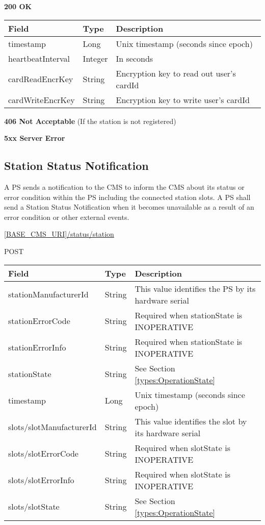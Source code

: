 \textbf{200 OK}

\begin{tabularx}{\linewidth}{ | l | l | X | }
  \hline
  \rowcolor{table-head}
  Field & Type & Description \\
  \hline
  timestamp & Long & Unix timestamp (seconds since epoch) \\
  heartbeatInterval & Integer & In seconds \\
  cardReadEncrKey & String & Encryption key to read out user's cardId \\
  cardWriteEncrKey & String & Encryption key to write user's cardId \\
    \hline
\end{tabularx}

\textbf{406 Not Acceptable} (If the station is not registered)

\textbf{5xx Server Error}

\subsection{Station Status Notification}

A \acs{PS} sends a notification to the \acs{CMS} to inform the \acs{CMS} about its status or error condition within the \acs{PS} including the connected station slots. A \acs{PS} shall send a Station Status Notification when it becomes unavailable as a result of an error condition or other external events.

 \url{[BASE_CMS_URI]/status/station}

 POST

\begin{table}[!h]
\vspace{-7mm}
\begin{tabularx}{\linewidth}{ | l  | l | X | }
  \hline
  \rowcolor{table-head}
  Field & Type & Description \\
  \hline
  stationManufacturerId & String 		& This value identifies the \acs{PS} by its hardware serial\\
  stationErrorCode & String & Required when stationState is INOPERATIVE \\
  stationErrorInfo & String & Required when stationState is INOPERATIVE \\
  stationState & String & See Section \ref{types:OperationState} \\
  timestamp & Long & Unix timestamp (seconds since epoch) \\
  slots/slotManufacturerId & String 	& This value identifies the slot by its hardware serial \\
  slots/slotErrorCode & String & Required when slotState is INOPERATIVE \\
  slots/slotErrorInfo & String & Required when slotState is INOPERATIVE \\
  slots/slotState & String & See Section \ref{types:OperationState} \\
  \hline
\end{tabularx}
\end{table}

